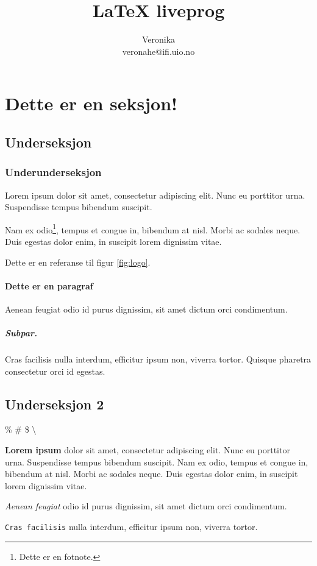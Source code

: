 \documentclass[12pt]{article}
\title{\LaTeX{} liveprog}
\author{Veronika\\ veronahe@ifi.uio.no}
\begin{document}
\maketitle

\tableofcontents


\section{Dette er en seksjon!}
\subsection{Underseksjon}
\subsubsection{Underunderseksjon}
Lorem ipsum dolor sit amet, consectetur adipiscing elit. Nunc eu porttitor urna. Suspendisse tempus bibendum suscipit. 

Nam ex odio\footnote{Dette er en fotnote.}, tempus et congue in, bibendum at nisl. Morbi ac sodales neque. Duis egestas dolor enim, in suscipit lorem dignissim vitae. 

Dette er en referanse til figur \ref{fig:logo}.

\paragraph{Dette er en paragraf}

Aenean feugiat odio id purus dignissim, sit amet dictum orci condimentum. 
\subparagraph{Subpar.}
Cras facilisis nulla interdum, efficitur ipsum non, viverra tortor. Quisque pharetra consectetur orci id egestas.
\subsection{Underseksjon 2}

\newpage

\% \# \$ \textbackslash


\textbf{Lorem ipsum} dolor sit amet, consectetur adipiscing elit. Nunc eu porttitor urna. Suspendisse tempus bibendum suscipit. Nam ex odio, tempus et congue in, bibendum at nisl. Morbi ac sodales neque. Duis egestas dolor enim, in suscipit lorem dignissim vitae. 


\textit{Aenean feugiat} odio id purus dignissim, sit amet dictum orci condimentum. 

\texttt{Cras facilisis} nulla interdum, efficitur ipsum non, viverra tortor. 
\end{document}
